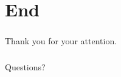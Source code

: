 \documentclass[18pt]{beamer}
\begin{document}
\section{End}
\begin{frame}
  \frametitle{}
  \begin{center}
    \huge{Thank you for your attention.}
  \end{center}
\end{frame}

\begin{frame}
  \frametitle{}
  \begin{center}
    \huge{Questions?}
  \end{center}
\end{frame}
\end{document}
